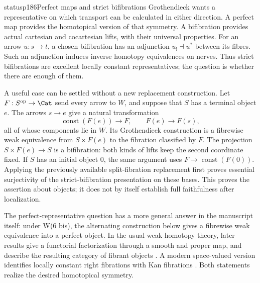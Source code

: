 \begin{dcomment}{status}{p186}{Perfect maps and strict bifibrations}
Grothendieck wants a representative on which transport can be calculated in either direction. A perfect map provides the homotopical version of that symmetry. A bifibration provides actual cartesian and cocartesian lifts, with their universal properties. For an arrow $u:s\to t$, a chosen bifibration has an adjunction $u_!\dashv u^*$ between its fibres. Such an adjunction induces inverse homotopy equivalences on nerves. Thus strict bifibrations are excellent locally constant representatives; the question is whether there are enough of them.

A useful case can be settled without a new replacement construction. Let $F:S^{\mathrm{op}}\to\Cat$ send every arrow to $W$, and suppose that $S$ has a terminal object $e$. The arrows $s\to e$ give a natural transformation
\[
\operatorname{const}(F(e))\longrightarrow F,
\qquad F(e)\longrightarrow F(s),
\]
all of whose components lie in $W$. Its Grothendieck construction is a fibrewise weak equivalence from $S\times F(e)$ to the fibration classified by $F$. The projection $S\times F(e)\to S$ is a bifibration: both kinds of lifts keep the second coordinate fixed. If $S$ has an initial object $0$, the same argument uses $F\to\operatorname{const}(F(0))$. Applying the previously available split-fibration replacement first proves essential surjectivity of the strict-bifibration presentation on these bases. This proves the assertion about objects; it does not by itself establish full faithfulness after localization.

The perfect-representative question has a more general answer in the manuscript itself: under W(6 bis), the alternating construction below gives a fibrewise weak equivalence into a perfect object. In the usual weak-homotopy theory, later results give a functorial factorization through a smooth and proper map, and describe the resulting category of fibrant objects \citep[Proposition~4.4]{Cisinski2009LocallyConstant}. A modern space-valued version identifies locally constant right fibrations with Kan fibrations \citep[Theorem~4.6.10, author's July~2026 revision]{Cisinski2019HigherCategories}. Both statements realize the desired homotopical symmetry.


\end{dcomment}
